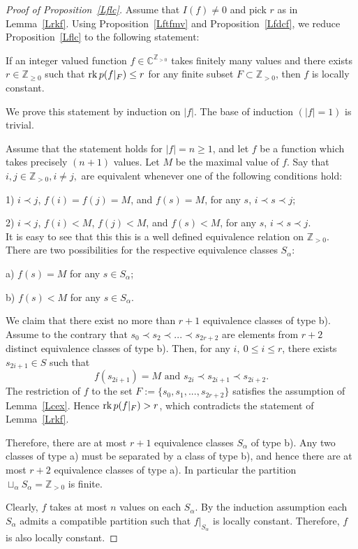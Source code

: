 \documentclass[10pt]{amsart}\oddsidemargin -1mm \evensidemargin -1mm \topmargin -15mm\headheight5mm \headsep 3.5mm \textheight 245mm\textwidth 170mm %
\theoremstyle{definition}\newtheorem{theorem}{Theorem}[section]\newtheorem{lemma}[theorem]{Lemma}\newtheorem{remark}[theorem]{Remark}\newtheorem{proposition}[theorem]{Proposition}\newtheorem{corollary}[theorem]{Corollary}\newtheorem{definition}[theorem]{Definition}\newtheorem{Ex}[theorem]{Example}
\newcounter{AP}
\begin{document}
\begin{proof}[Proof of Proposition~\ref{Lflc}] Assume that $I(f)\ne0$ and pick
$r$ as in Lemma~\ref{Lrkf}. Using Proposition~\ref{Lftfmv} and Proposition~\ref{Lfdcf}, we reduce Proposition~\ref{Lflc} to the following statement:

If an integer valued function $f\in\mathbb C^{\mathbb Z_{>0}}$ takes finitely many values and there exists $r\in\mathbb Z_{\ge0}$ such that $\operatorname{\mathrm{rk}} p(f|_F)\le r$ for any finite subset $F\subset \mathbb Z_{>0}$,  then $f$ is
locally constant.

We prove this statement by induction on $|f|$. The base of induction $(|f|=1)$ is trivial.


Assume that the statement holds for $|f|=n\ge1$, and let $f$ be a function which
takes precisely $(n+1)$ values. Let $M$ be the maximal value of $f$. Say that $i, j\in \mathbb Z_{>0}, i\ne j,$ are equivalent whenever one of the following conditions hold:

1) $i\prec j$, $f(i)=f(j)=M$, and $f(s)=M$, for any $s$, $i\prec s\prec
j$;

2) $i\prec j$, $f(i)<M$, $f(j)<M$, and $f(s)<M$, for any $s$, $i\prec
s\prec j$.\\
It is easy to see that this this is a well defined equivalence relation on $\mathbb Z_{>0}$. There are two possibilities for the respective equivalence classes $S_\alpha$:

a) $f(s)=M$ for any $s\in S_\alpha$;

b) $f(s)<M$ for any $s\in S_\alpha$.

We claim that there exist no more than $r+1$ equivalence classes of type b).
Assume to the contrary that $s_0\prec s_2\prec...\prec s_{2r+2}$ are elements from $r+2$ distinct equivalence classes of type b). Then, for any
$i,~0\le i\le r$, there exists $s_{2i+1}\in S$ such that
$$f(s_{2i+1})=M\mbox{~and~}s_{2i}\prec s_{2i+1}\prec s_{2i+2}.$$ The restriction of $f$ to the set $F:=\{s_0, s_1,..., s_{2r+2}\}$ satisfies the assumption of Lemma~\ref{Lcex}. Hence
$\operatorname{\mathrm{rk}} p(f|_F)> r$, which contradicts the statement of Lemma~\ref{Lrkf}.

Therefore, there are at most $r+1$ equivalence classes $S_\alpha$ of type b). Any two classes of type a) must be
separated by a class of type b), and hence there are at most $r+2$ equivalence
classes of type a). In particular the partition $\sqcup_\alpha S_\alpha=\mathbb Z_{>0}$ is finite.

Clearly, $f$ takes at most $n$ values on each $S_\alpha$. By the induction assumption each $S_\alpha$ admits a compatible partition such that $f|_{S_\alpha}$ is locally constant. Therefore, $f$ is also locally constant.\end{proof}
\end{document}
